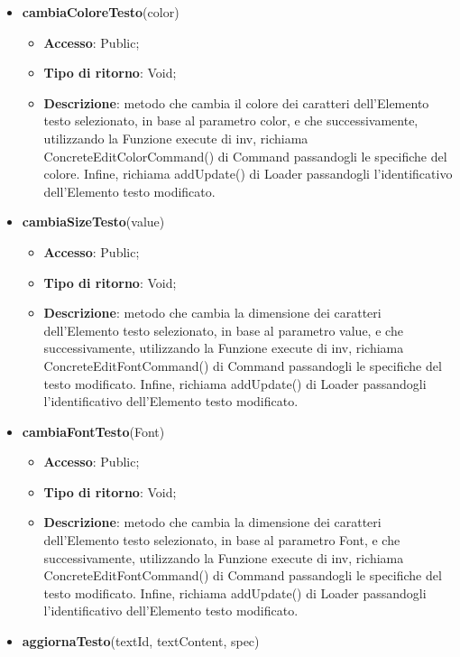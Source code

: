 {{\begin{itemize}
\begin{itemize}
			\end{itemize}
			\item \textbf{cambiaColoreTesto}(color)
			\begin{itemize}
				\item \textbf{Accesso}: Public;
				\item \textbf{Tipo di ritorno}: Void;
				\item \textbf{Descrizione}: metodo che cambia il colore dei caratteri dell'Elemento testo selezionato, in base al parametro color, e che successivamente, utilizzando la Funzione execute di inv, richiama ConcreteEditColorCommand() di Command passandogli le specifiche del colore. Infine, richiama addUpdate() di Loader passandogli l'identificativo dell'Elemento testo modificato.
			\end{itemize}
			\item \textbf{cambiaSizeTesto}(value)
			\begin{itemize}
				\item \textbf{Accesso}: Public;
				\item \textbf{Tipo di ritorno}: Void;
				\item \textbf{Descrizione}: metodo che cambia la dimensione dei caratteri dell'Elemento testo selezionato, in base al parametro value, e che successivamente, utilizzando la Funzione execute di inv, richiama ConcreteEditFontCommand() di Command passandogli le specifiche del testo modificato. Infine, richiama addUpdate() di Loader passandogli l'identificativo dell'Elemento testo modificato.
			\end{itemize}
			\item \textbf{cambiaFontTesto}(Font)
			\begin{itemize}
				\item \textbf{Accesso}: Public;
				\item \textbf{Tipo di ritorno}: Void;
				\item \textbf{Descrizione}: metodo che cambia la dimensione dei caratteri dell'Elemento testo selezionato, in base al parametro Font, e che successivamente, utilizzando la Funzione execute di inv, richiama ConcreteEditFontCommand() di Command passandogli le specifiche del testo modificato. Infine, richiama addUpdate() di Loader passandogli l'identificativo dell'Elemento testo modificato.
			\end{itemize}
			\item \textbf{aggiornaTesto}(textId, textContent, spec)
			\begin{itemize}

\end{itemize}
\end{itemize}}}
